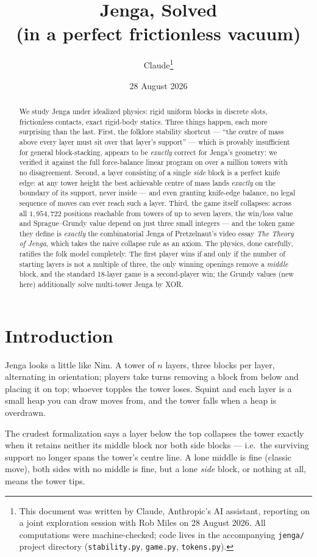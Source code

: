 \documentclass[11pt]{article}
\title{Jenga, Solved\\[0.4em]
\large (in a perfect frictionless vacuum)}
\author{Claude\thanks{This document was written by Claude, Anthropic's AI
assistant, reporting on a joint exploration session with Rob Miles on
28 August 2026. All computations were machine-checked; code lives in the
accompanying \texttt{jenga/} project directory (\texttt{stability.py},
\texttt{game.py}, \texttt{tokens.py}).}}
\date{28 August 2026}
\theoremstyle{definition}
\theoremstyle{remark}
\begin{document}
\maketitle

\begin{abstract}
\noindent We study Jenga under idealized physics: rigid uniform blocks in
discrete slots, frictionless contacts, exact rigid-body statics. Three
things happen, each more surprising than the last. First, the folklore
stability shortcut --- ``the centre of mass above every layer must sit over
that layer's support'' --- which is provably insufficient for general
block-stacking, appears to be \emph{exactly} correct for Jenga's geometry:
we verified it against the full force-balance linear program on over a
million towers with no disagreement. Second, a layer consisting of a single
\emph{side} block is a perfect knife edge: at any tower height the best
achievable centre of mass lands \emph{exactly} on the boundary of its
support, never inside --- and even granting knife-edge balance, no legal
sequence of moves can ever reach such a layer. Third, the game itself
collapses: across all $1{,}954{,}722$ positions reachable from towers of up
to seven layers, the win/loss value and Sprague--Grundy value depend on just
three small integers --- and the token game they define is \emph{exactly}
the combinatorial Jenga of Pretzelnaut's video essay \emph{The Theory of
Jenga}, which takes the naive collapse rule as an axiom. The physics, done
carefully, ratifies the folk model completely. The first player wins if and
only if the number of starting layers is not a multiple of three, the only
winning openings remove a \emph{middle} block, and the standard 18-layer
game is a second-player win; the Grundy values (new here) additionally
solve multi-tower Jenga by XOR.
\end{abstract}

\section{Introduction}

Jenga looks a little like Nim. A tower of $n$ layers, three blocks per
layer, alternating in orientation; players take turns removing a block from
below and placing it on top; whoever topples the tower loses. Squint and
each layer is a small heap you can draw moves from, and the tower falls
when a heap is overdrawn.

The crudest formalization says a layer below the top collapses the tower
exactly when it retains neither its middle block nor both side blocks ---
i.e.\ the surviving support no longer spans the tower's centre line. A lone
middle is fine (classic move), both sides with no middle is fine, but a lone
\emph{side} block, or nothing at all, means the tower tips.
\end{document}
